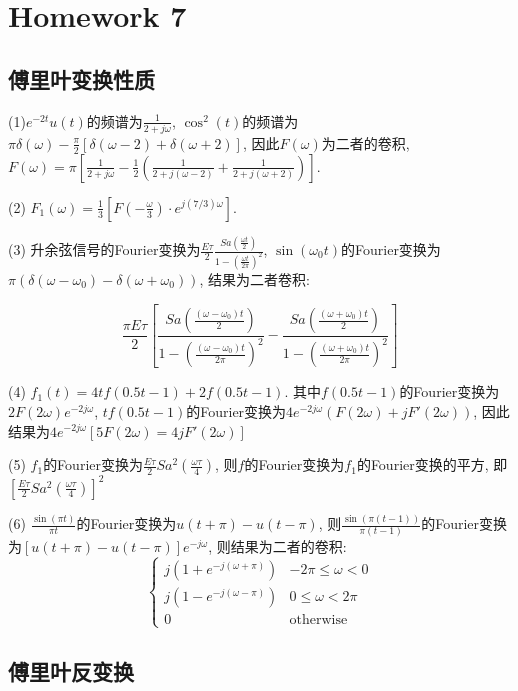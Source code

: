 
\section{Homework 7}

\subsection{傅里叶变换性质}


(1)$e^{-2t}u(t)$的频谱为$\frac{1}{2+j\omega}$, $\cos^2(t)$的频谱为$\pi\delta(\omega)-
\frac{\pi}{2}[\delta(\omega-2)+\delta(\omega+2)]$, 因此$F(\omega)$为二者的卷积,
$F(\omega)=\pi[\frac{1}{2+j\omega}-\frac{1}{2}(\frac{1}{2+j(\omega-2)}+\frac{1}{2+j(\omega+2)})]$.

(2) $F_1(\omega)=\frac{1}{3}[F(-\frac{\omega}{3})\cdot e^{j(7/3)\omega}]$.

(3) 升余弦信号的Fourier变换为$\frac{E\tau}{2}\frac{Sa(\frac{\omega t}{2})}{1-(\frac{\omega t}{2\pi})^2}$, $\sin(\omega_0 t)$的Fourier变换为$\pi(\delta(\omega-\omega_0)-\delta(\omega+\omega_0))$, 结果为二者卷积:

\begin{equation*}
    \frac{\pi E\tau}{2}\left[\frac{Sa(\frac{(\omega-\omega_0) t}{2})}{1-(\frac{(\omega-\omega_0) t}{2\pi})^2}-\frac{Sa(\frac{(\omega+\omega_0) t}{2})}{1-(\frac{(\omega+\omega_0) t}{2\pi})^2}\right]
\end{equation*}

(4) $f_1(t)=4tf(0.5t-1)+2f(0.5t-1)$. 其中$f(0.5t-1)$的Fourier变换为$2F(2\omega)e^{-2j\omega}$, $tf(0.5t-1)$的Fourier变换为$4e^{-2j\omega}(F(2\omega)+jF'(2\omega))$, 因此结果为$4e^{-2j\omega}[5F(2\omega)=4jF'(2\omega)]$

(5) $f_1$的Fourier变换为$\frac{E\tau}{2}Sa^2(\frac{\omega\tau}{4})$, 则$f$的Fourier变换为$f_1$的Fourier变换的平方, 即$[\frac{E\tau}{2}Sa^2(\frac{\omega\tau}{4})]^2$

(6) $\frac{\sin(\pi t)}{\pi t}$的Fourier变换为$u(t+\pi)-u(t-\pi)$, 则$\frac{\sin(\pi (t-1))}{\pi (t-1)}$的Fourier变换为$[u(t+\pi)-u(t-\pi)]e^{-j\omega}$, 则结果为二者的卷积: 
$$\left\{\begin{array}{ll}
    j(1+e^{-j(\omega+\pi)}) & -2\pi \le \omega < 0 \\
    j(1-e^{-j(\omega-\pi)}) & 0 \le \omega < 2\pi \\
    0 & \text{otherwise}
\end{array}\right.$$

\subsection{傅里叶反变换}

